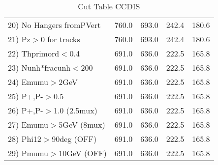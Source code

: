 \begin{table}[h!]
\begin{tabular}{||l||r|r|r|r||}
 20) No Hangers fromPVert &       760.0 &       693.0 &       242.4 &       180.6 \\
 21) Pz$>$0 for tracks    &       760.0 &       693.0 &       242.4 &       180.6 \\
 22) Thprimord$<$0.4      &       691.0 &       636.0 &       222.5 &       165.8 \\
 23) Nunh*fracunh$<$200   &       691.0 &       636.0 &       222.5 &       165.8 \\
 24) Emumu$>$2GeV         &       691.0 &       636.0 &       222.5 &       165.8 \\
 25) P+,P-$>$0.5          &       691.0 &       636.0 &       222.5 &       165.8 \\
 26) P+,P-$>$1.0 (2.5mux) &       691.0 &       636.0 &       222.5 &       165.8 \\
 27) Emumu$>$5GeV  (8mux) &       691.0 &       636.0 &       222.5 &       165.8 \\
 28) Phi12$>$90deg  (OFF) &       691.0 &       636.0 &       222.5 &       165.8 \\
 29) Pmumu$>$10GeV  (OFF) &       691.0 &       636.0 &       222.5 &       165.8 \\
 \hline
 \hline
 \end{tabular}
 \caption{Cut Table  CCDIS  }
 \label{tab-cut_ccdis}
 \end{table}
